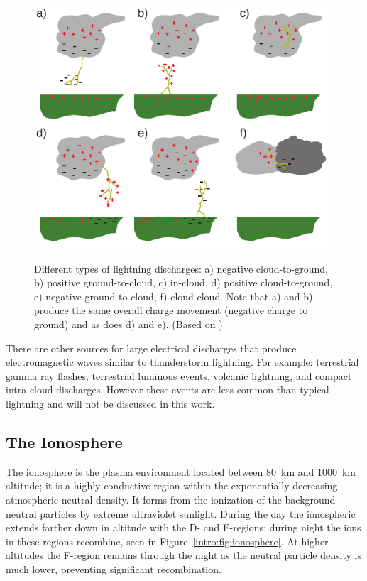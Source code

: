 \begin{figure}[ht!]
	\centering
	\includegraphics[scale=1]{Introduction/Figures/lightning_types.pdf}\\
	\caption{Different types of lightning discharges:
			a) negative cloud-to-ground,
			b) positive ground-to-cloud,
			c) in-cloud,
			d) positive cloud-to-ground,
			e) negative ground-to-cloud,
			f) cloud-cloud.
			Note that a) and b) produce the same overall charge movement (negative charge to ground) and as does d) and e).
			 (Based on \citet{Uman1969})}
	\label{intro:fig:types}
\end{figure}

There are other sources for large electrical discharges that produce electromagnetic waves similar to thunderstorm lightning.
For example: terrestrial gamma ray flashes, terrestrial luminous events, volcanic lightning, and compact intra-cloud discharges.
However these events are less common than typical lightning and will not be discussed in this work.

\subsection{The Ionosphere}

The ionosphere is the plasma environment located between 80~km and 1000~km altitude; it is a highly conductive region within the exponentially decreasing atmospheric neutral density.
It forms from the ionization of the background neutral particles by extreme ultraviolet sunlight.
During the day the ionospheric extends farther down in altitude with the D- and E-regions; during night the ions in these regions recombine, seen in Figure~\ref{intro:fig:ionosphere}.
At higher altitudes the F-region remains through the night as the neutral particle density is much lower, preventing significant recombination.

